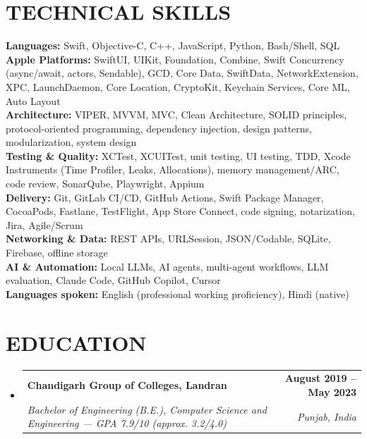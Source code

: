 \documentclass[letterpaper,11pt]{article}
\makeatletter
\newcommand{\resumeSubheading}[4]{
  \vspace{-2pt}\item
    \begin{tabular*}{1.0\textwidth}[t]{l@{\extracolsep{\fill}}r}
      \textbf{\large#1} & \textbf{\small #2} \\
      \textit{\small#3} & \textit{\small #4} \\
    \end{tabular*}\vspace{-7pt}
}
\newcommand{\resumeSubHeadingListStart}{\begin{itemize}[leftmargin=0.0in, label={}]}
\newcommand{\resumeSubHeadingListEnd}{\end{itemize}}
\makeatother
\begin{document}
\section{TECHNICAL SKILLS}
 \begin{itemize}[leftmargin=0.15in, label={}]
    \small{\item{
     \textbf{Languages:} Swift, Objective-C, C++, JavaScript, Python, Bash/Shell, SQL \\ \vspace{2pt}
     \textbf{Apple Platforms:} SwiftUI, UIKit, Foundation, Combine, Swift Concurrency (async/await, actors, Sendable), GCD, Core Data, SwiftData, NetworkExtension, XPC, LaunchDaemon, Core Location, CryptoKit, Keychain Services, Core ML, Auto Layout \\ \vspace{2pt}
     \textbf{Architecture:} VIPER, MVVM, MVC, Clean Architecture, SOLID principles, protocol-oriented programming, dependency injection, design patterns, modularization, system design \\ \vspace{2pt}
     \textbf{Testing \& Quality:} XCTest, XCUITest, unit testing, UI testing, TDD, Xcode Instruments (Time Profiler, Leaks, Allocations), memory management/ARC, code review, SonarQube, Playwright, Appium \\ \vspace{2pt}
     \textbf{Delivery:} Git, GitLab CI/CD, GitHub Actions, Swift Package Manager, CocoaPods, Fastlane, TestFlight, App Store Connect, code signing, notarization, Jira, Agile/Scrum \\ \vspace{2pt}
     \textbf{Networking \& Data:} REST APIs, URLSession, JSON/Codable, SQLite, Firebase, offline storage \\ \vspace{2pt}
     \textbf{AI \& Automation:} Local LLMs, AI agents, multi-agent workflows, LLM evaluation, Claude Code, GitHub Copilot, Cursor \\ \vspace{2pt}
     \textbf{Languages spoken:} English (professional working proficiency), Hindi (native)
    }}
 \end{itemize}

\vspace{-10pt}

\section{EDUCATION}
  \resumeSubHeadingListStart
    \resumeSubheading
      {Chandigarh Group of Colleges, Landran}{August 2019 -- May 2023}
      {Bachelor of Engineering (B.E.), Computer Science and Engineering — GPA 7.9/10 (approx. 3.2/4.0)}{Punjab, India}
  \resumeSubHeadingListEnd
\end{document}

